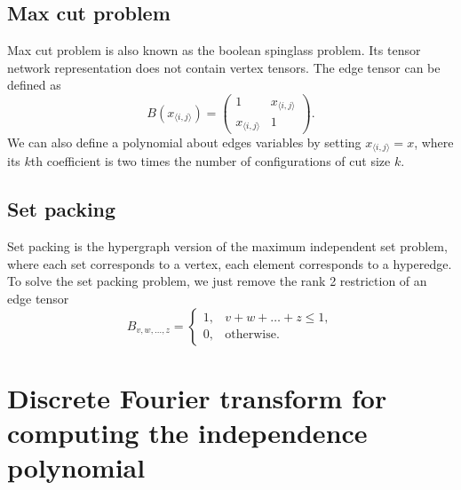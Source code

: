 \documentclass[onefignum, onetabnum]{siamart190516}
\newcommand{\<}{\langle}
\renewcommand{\>}{\rangle}
\begin{document}
\subsection{Max cut problem}
Max cut problem is also known as the boolean spinglass problem.
Its tensor network representation does not contain vertex tensors.
The edge tensor can be defined as
\begin{equation}
    B(x_{\langle i, j\rangle}) = \left(\begin{matrix}
        1 & x_{\langle i, j\rangle}\\
        x_{\langle i, j\rangle} & 1
    \end{matrix}\right).
\end{equation}
We can also define a polynomial about edges variables by setting $x_{\langle i, j\rangle} = x$,
where its $k$th coefficient is two times the number of configurations of cut size $k$.

\subsection{Set packing}
Set packing is the hypergraph version of the maximum independent set problem, where each set corresponds to a vertex, each element corresponds to a hyperedge.
To solve the set packing problem, we just remove the rank 2 restriction of an edge tensor
\begin{equation}
    B_{v,w,\ldots, z} = \begin{cases}
        1, & v+w+\ldots+z\leq 1,\\
        0, & \text{otherwise}.
    \end{cases}
\end{equation}

\section{Discrete Fourier transform for computing the independence polynomial}\label{app:fft}
\end{document}
